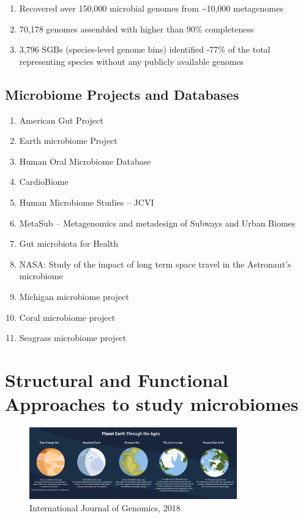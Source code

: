 \documentclass[
]{book}
\providecommand{\tightlist}{%
  \setlength{\itemsep}{0pt}\setlength{\parskip}{0pt}}
\begin{document}
\begin{enumerate}
\def\labelenumi{\arabic{enumi}.}
\item
  Recovered over 150,000 microbial genomes from \textasciitilde10,000 metagenomes
\item
  70,178 genomes assembled with higher than 90\% completeness
\item
  3,796 SGBs (species-level genome bins) identified -77\% of the total representing species without any publicly available genomes
\end{enumerate}

\hypertarget{microbiome-projects-and-databases}{%
\subsection{Microbiome Projects and Databases}\label{microbiome-projects-and-databases}}

\begin{enumerate}
\def\labelenumi{\arabic{enumi}.}
\tightlist
\item
  American Gut Project
\item
  Earth microbiome Project
\item
  Human Oral Microbiome Database
\item
  CardioBiome
\item
  Human Microbiome Studies -- JCVI
\item
  MetaSub -- Metagenomics and metadesign of Subways and Urban Biomes
\item
  Gut microbiota for Health
\item
  NASA: Study of the impact of long term space travel in the Astronaut's
  microbiome
\item
  Michigan microbiome project
\item
  Coral microbiome project
\item
  Seagrass microbiome project
\end{enumerate}

\hypertarget{structural-and-functional-approaches-to-study-microbiomes}{%
\section{Structural and Functional Approaches to study microbiomes}\label{structural-and-functional-approaches-to-study-microbiomes}}

\begin{figure}
\centering
\includegraphics[width=0.8\textwidth,height=\textheight]{./Figures/Planets.png}
\caption{International Journal of Genomics, 2018}
\end{figure}
\end{document}

